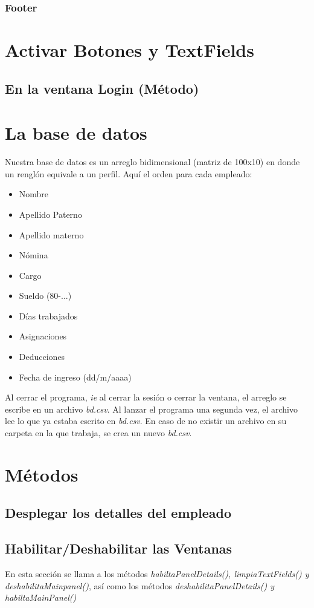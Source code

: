 \documentclass[12pt]{article}
\begin{document}
\subsubsection{Footer}



\section{Activar Botones y TextFields}

\subsection{En la ventana Login (M\'etodo)}


\section{La base de datos}
{Nuestra base de datos es un arreglo bidimensional (matriz de 100x10) en donde un rengl\'on equivale a un perfil. Aqu\'i el orden para cada empleado:}
\begin{itemize}
\item Nombre
\item Apellido Paterno
\item Apellido materno
\item N\'omina
\item Cargo
\item Sueldo (80-...)
\item D\'ias trabajados
\item Asignaciones
\item Deducciones
\item Fecha de ingreso (dd/m/aaaa)
\end{itemize}
{Al cerrar el programa, \textit{ie} al cerrar la sesi\'on o cerrar la ventana, el arreglo se escribe en un archivo \textit{bd.csv}. Al lanzar el programa una segunda vez, el archivo lee lo que ya estaba escrito en \textit{bd.csv}. En caso de no existir un archivo en su carpeta en la que trabaja, se crea un nuevo \textit{bd.csv}.}

\section{M\'etodos}
\subsection{Desplegar los detalles del empleado}


\subsection{Habilitar/Deshabilitar las Ventanas}
{En esta secci\'on se llama a los m\'etodos \textit{habiltaPanelDetails(), limpiaTextFields() y deshabilitaMainpanel()}, as\'i como los m\'etodos \textit{deshabilitaPanelDetails() y habiltaMainPanel()} }
\end{document}
